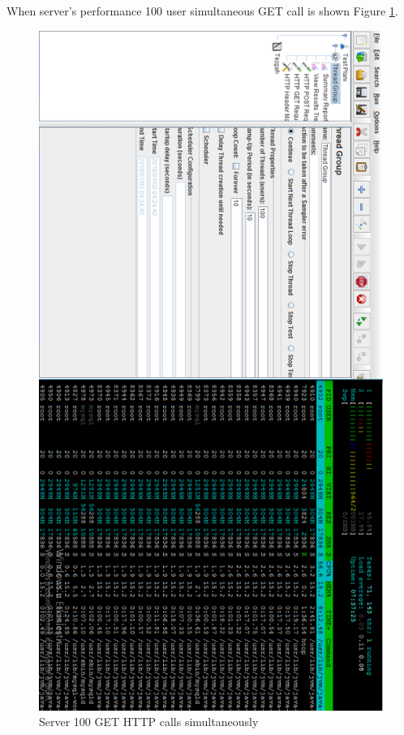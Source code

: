 When server's performance 100 user simultaneous GET call is shown Figure
\ref{fig:100users}.

\begin{figure}[!htbp]
\centering
\includegraphics[width=\textwidth]{projectChapters/images/100users.png}
\caption{Server 100 GET HTTP calls simultaneously}
\label{fig:100users}
\end{figure}


